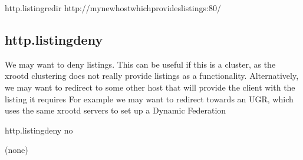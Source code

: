 \documentclass[12pt]{article} %
\begin{document}
http.listingredir http://mynewhostwhichprovideslistings:80/
\subsection{http.listingdeny}
We may want to deny listings. This can be useful if this is a cluster,
as the xrootd clustering does not really provide listings as a functionality.
Alternatively, we may want to redirect to some other host that
will provide the client with the listing it requires
For example we may want to redirect towards an UGR, which uses the same
xrootd servers to set up a Dynamic Federation

http.listingdeny no

\begin{thebibliography}{9}

(none)

\end{thebibliography}
\end{document}
